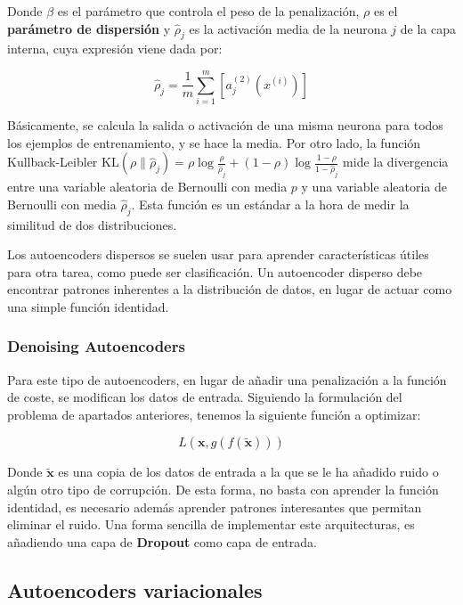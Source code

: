 \documentclass[
  12pt,
  a4paperpaper,
]{report}
\begin{document}
Donde \(\beta\) es el parámetro que controla el peso de la penalización,
\(\rho\) es el \textbf{parámetro de dispersión} y \(\hat{\rho}_{j}\) es
la activación media de la neurona \(j\) de la capa interna, cuya
expresión viene dada por:

\[\hat{\rho}_{j}=\frac{1}{m} \sum_{i=1}^{m}\left[a_{j}^{(2)}\left(x^{(i)}\right)\right]\]

Básicamente, se calcula la salida o activación de una misma neurona para
todos los ejemplos de entrenamiento, y se hace la media. Por otro lado,
la función Kullback-Leibler
\(\mathrm{KL}\left(\rho \| \hat{\rho}_{j}\right)=\rho \log \frac{\rho}{\hat{\rho}_{j}}+(1-\rho) \log \frac{1-\rho}{1-\hat{\rho}_{j}}\)
mide la divergencia entre una variable aleatoria de Bernoulli con media
\(p\) y una variable aleatoria de Bernoulli con media
\(\hat{\rho}_{j}\). Esta función es un estándar a la hora de medir la
similitud de dos distribuciones.

Los autoencoders dispersos se suelen usar para aprender características
útiles para otra tarea, como puede ser clasificación. Un autoencoder
disperso debe encontrar patrones inherentes a la distribución de datos,
en lugar de actuar como una simple función identidad.

\hypertarget{denoising-autoencoders}{%
\subsubsection{Denoising Autoencoders}\label{denoising-autoencoders}}

Para este tipo de autoencoders, en lugar de añadir una penalización a la
función de coste, se modifican los datos de entrada. Siguiendo la
formulación del problema de apartados anteriores, tenemos la siguiente
función a optimizar:

\[L(\boldsymbol{x}, g(f(\tilde{\boldsymbol{x}})))\]

Donde \(\tilde{\boldsymbol{x}}\) es una copia de los datos de entrada a
la que se le ha añadido ruido o algún otro tipo de corrupción. De esta
forma, no basta con aprender la función identidad, es necesario además
aprender patrones interesantes que permitan eliminar el ruido. Una forma
sencilla de implementar este arquitecturas, es añadiendo una capa de
\textbf{Dropout} como capa de entrada.

\hypertarget{autoencoders-variacionales}{%
\subsection{Autoencoders
variacionales}\label{autoencoders-variacionales}}
\end{document}
